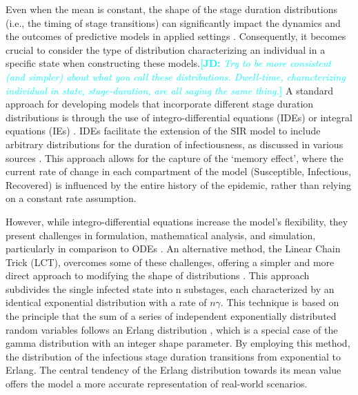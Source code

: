 \documentclass[12pt]{article}
\newcommand{\comment}{\showcomment}
\newcommand{\showcomment}[3]{\textcolor{#1}{\textbf{[#2: }\textsl{#3}\textbf{]}}}
\newcommand{\jd}[1]{\comment{cyan}{JD}{#1}}
\begin{document}
Even when the mean is constant, the shape of the stage duration distributions (i.e., the timing of stage transitions) can significantly impact the dynamics and the outcomes of predictive models in applied settings \cite{krylova2013effects}\cite{keeling2002understanding}\cite{wearing2005appropriate}\cite{nguyen2008noise}. Consequently, it becomes crucial to consider the type of distribution characterizing an individual in a specific state when constructing these models.\jd{Try to be more consistent (and simpler) about what you call these distributions. Dwell-time, characterizing individual in state, stage-duration, are all saying the same thing.} A standard approach for developing models that incorporate different stage duration distributions is through the use of integro-differential equations (IDEs) or integral equations (IEs) \cite{hurtado2019generalizations}\cite{kermack1927contribution}\cite{hethcote1980integral}. IDEs facilitate the extension of the SIR model to include arbitrary distributions for the duration of infectiousness, as discussed in various sources \cite{feng2000endemic}\cite{hethcote1980integral}\cite{ma2006generality}. This approach allows for the capture of the `memory effect', where the current rate of change in each compartment of the model (Susceptible, Infectious, Recovered) is influenced by the entire history of the epidemic, rather than relying on a constant rate assumption.

However, while integro-differential equations increase the model's flexibility, they present challenges in formulation, mathematical analysis, and simulation, particularly in comparison to ODEs \cite{krylova2013effects}\cite{hurtado2019generalizations}\cite{burton2005volterra}. An alternative method, the Linear Chain Trick (LCT), overcomes some of these challenges, offering a simpler and more direct approach to modifying the shape of distributions \cite{macdonald1978time}\cite{smith2011introduction}. This approach subdivides the single infected state into n substages, each characterized by an identical exponential distribution with a rate of $n\gamma$. This technique is based on the principle that the sum of a series of independent exponentially distributed random variables follows an Erlang distribution \cite{krylova2013effects}\cite{therrien2018probability}, which is a special case of the gamma distribution with an integer shape parameter. By employing this method, the distribution of the infectious stage duration transitions from exponential to Erlang. The central tendency of the Erlang distribution towards its mean value offers the model a more accurate representation of real-world scenarios.
\end{document}
